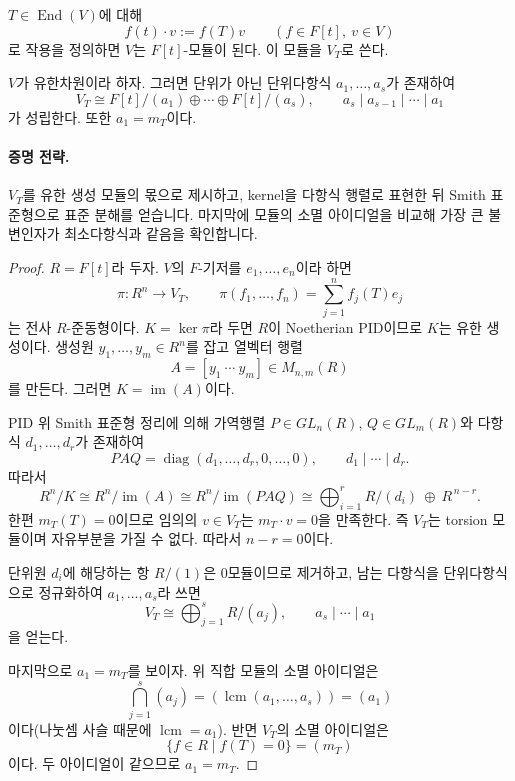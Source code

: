 \begin{definition}
$T\in\operatorname{End}(V)$에 대해
\[
f(t)\cdot v:=f(T)v\qquad(f\in F[t],\ v\in V)
\]
로 작용을 정의하면 $V$는 $F[t]$-모듈이 된다. 이 모듈을 $V_T$로 쓴다.
\end{definition}

\begin{theorem}
$V$가 유한차원이라 하자. 그러면 단위가 아닌 단위다항식 $a_1,\dots,a_s$가 존재하여
\[
V_T\cong F[t]/(a_1)\oplus\cdots\oplus F[t]/(a_s),\qquad
a_s\mid a_{s-1}\mid\cdots\mid a_1
\]
가 성립한다. 또한 $a_1=m_T$이다.
\end{theorem}

\paragraph{증명 전략.}
$V_T$를 유한 생성 모듈의 몫으로 제시하고, kernel을 다항식 행렬로 표현한 뒤 Smith 표준형으로 표준 분해를 얻습니다. 마지막에 모듈의 소멸 아이디얼을 비교해 가장 큰 불변인자가 최소다항식과 같음을 확인합니다.

\begin{proof}
$R=F[t]$라 두자. $V$의 $F$-기저를 $e_1,\dots,e_n$이라 하면
\[
\pi:R^n\to V_T,\qquad \pi(f_1,\dots,f_n)=\sum_{j=1}^n f_j(T)e_j
\]
는 전사 $R$-준동형이다. $K=\ker\pi$라 두면 $R$이 Noetherian PID이므로 $K$는 유한 생성이다. 생성원 $y_1,\dots,y_m\in R^n$를 잡고 열벡터 행렬
\[
A=[y_1\ \cdots\ y_m]\in M_{n,m}(R)
\]
를 만든다. 그러면 $K=\operatorname{im}(A)$이다.

PID 위 Smith 표준형 정리에 의해 가역행렬 $P\in GL_n(R)$, $Q\in GL_m(R)$와 다항식 $d_1,\dots,d_r$가 존재하여
\[
PAQ=\operatorname{diag}(d_1,\dots,d_r,0,\dots,0),\qquad d_1\mid\cdots\mid d_r.
\]
따라서
\[
R^n/K\cong R^n/\operatorname{im}(A)\cong R^n/\operatorname{im}(PAQ)
\cong \bigoplus_{i=1}^r R/(d_i)\ \oplus\ R^{\,n-r}.
\]
한편 $m_T(T)=0$이므로 임의의 $v\in V_T$는 $m_T\cdot v=0$을 만족한다. 즉 $V_T$는 torsion 모듈이며 자유부분을 가질 수 없다. 따라서 $n-r=0$이다.

단위원 $d_i$에 해당하는 항 $R/(1)$은 0모듈이므로 제거하고, 남는 다항식을 단위다항식으로 정규화하여 $a_1,\dots,a_s$라 쓰면
\[
V_T\cong \bigoplus_{j=1}^s R/(a_j),\qquad a_s\mid\cdots\mid a_1
\]
을 얻는다.

마지막으로 $a_1=m_T$를 보이자. 위 직합 모듈의 소멸 아이디얼은
\[
\bigcap_{j=1}^s (a_j)=(\operatorname{lcm}(a_1,\dots,a_s))=(a_1)
\]
이다(나눗셈 사슬 때문에 $\operatorname{lcm}=a_1$). 반면 $V_T$의 소멸 아이디얼은
\[
\{f\in R\mid f(T)=0\}=(m_T)
\]
이다. 두 아이디얼이 같으므로 $a_1=m_T$.
\end{proof}

